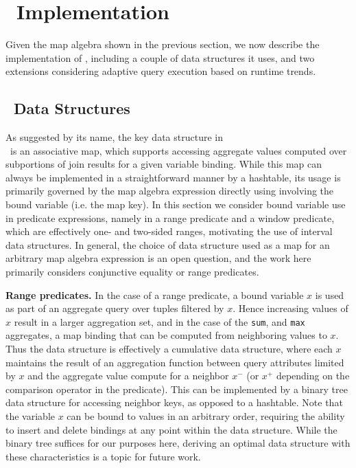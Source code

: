 \section{\compiler\ Implementation}
Given the map algebra shown in the previous section, we now describe
the implementation of \compiler, including a couple of data structures it
uses, and two extensions considering adaptive query execution based on runtime
trends.

\subsection{\compiler\ Data Structures}
As suggested by its name, the key data structure in\\\compiler\ is an
associative map, which supports accessing aggregate values computed over
subportions of join results for a given variable binding. While this map can
always be implemented in a straightforward manner by a hashtable, its usage is
primarily governed by the map algebra expression directly using involving the
bound variable (i.e. the map key). In this section we consider bound
variable use in predicate expressions, namely in a range predicate and a window
predicate, which are effectively one- and two-sided ranges, motivating the use
of interval data structures. In general, the choice of data structure used as a
map for an arbitrary map algebra expression is an open question, and the work
here primarily considers conjunctive equality or range predicates.

\textbf{Range predicates.}
In the case of a range predicate, a bound variable $x$ is used as part of an
aggregate query over tuples filtered by $x$. Hence increasing values of $x$
result in a larger aggregation set, and in the case of the \texttt{sum}, and
\texttt{max} aggregates, a map binding that can be computed from neighboring
values to $x$. Thus the data structure is effectively a cumulative data
structure, where each $x$ maintains the result of an aggregation function between
query attributes limited by $x$ and the aggregate value compute for a neighbor
$x^-$ (or $x^+$ depending on the comparison operator in the predicate). This can
be implemented by a binary tree data structure for accessing neighbor keys, as
opposed to a hashtable. Note that the variable $x$ can be bound to values in an
arbitrary order, requiring the ability to insert and delete bindings at any point
within the data structure. While the binary tree suffices for our purposes here,
deriving an optimal data structure with these characteristics is a topic for
future work.

